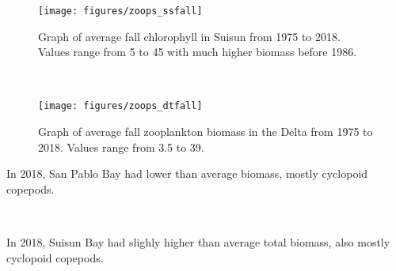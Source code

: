\documentclass[
]{book}
\begin{document}
\begin{panel-grid}
\begin{columns-nocenter}
\begin{column800}

\begin{expand}

\begin{figure}
\texttt{[image: figures/zoops\_ssfall]} \caption{Graph of average fall chlorophyll in Suisun from 1975 to 2018. Values range from 5 to 45 with much higher biomass before 1986.}\label{fig:unnamed-chunk-116}
\end{figure}

\end{expand}

\end{column800}

\begin{column40}

~

\end{column40}

\begin{column800}

\begin{expand}

\begin{figure}
\texttt{[image: figures/zoops\_dtfall]} \caption{Graph of average fall zooplankton biomass in the Delta from 1975 to 2018. Values range from 3.5 to 39.}\label{fig:unnamed-chunk-117}
\end{figure}

\end{expand}

\end{column800}

\end{columns-nocenter}

\begin{columns-nocenter}

\begin{column800}

In 2018, San Pablo Bay had lower than average biomass, mostly cyclopoid copepods.

\end{column800}

\begin{column40}

~

\end{column40}

\begin{column800}

In 2018, Suisun Bay had slighly higher than average total biomass, also mostly cyclopoid copepods.


\end{column800}
\end{columns-nocenter}
\end{panel-grid}
\end{document}
